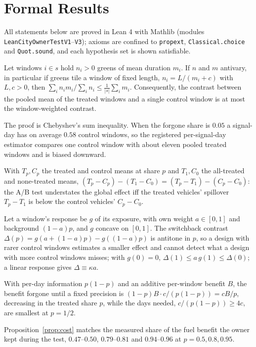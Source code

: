 \section{Formal Results}\label{sec:theory}
All statements below are proved in Lean 4 with Mathlib (modules \texttt{LeanCityOwnerTestV1}--\texttt{V3}); axioms are confined to
\texttt{propext}, \texttt{Classical.choice} and \texttt{Quot.sound}, and each hypothesis set is shown satisfiable.

\begin{proposition}\label{prop:pool}
Let windows $i\in s$ hold $n_i>0$ greens of mean duration $m_i$. If $n$ and $m$ antivary, in particular if greens tile a window of fixed
length, $n_i=L/(m_i+c)$ with $L,c>0$, then $\sum_i n_i m_i/\sum_i n_i \le \frac{1}{|s|}\sum_i m_i$. Consequently, the contrast between
the pooled mean of the treated windows and a single control window is at most the window-weighted contrast.
\end{proposition}
\noindent The proof is Chebyshev's sum inequality. When the forgone share is $0.05$ a signal-day has on average $0.58$ control windows, so
the registered per-signal-day estimator compares one control window with about eleven pooled treated windows and is biased downward.

\begin{proposition}[A/B accounting]\label{prop:ab}
With $T_p,C_p$ the treated and control means at share $p$ and $T_1,C_0$ the all-treated and none-treated means,
$(T_p-C_p)-(T_1-C_0)=(T_p-T_1)-(C_p-C_0)$: the A/B test understates the global effect iff the treated vehicles' spillover
$T_p-T_1$ is below the control vehicles' $C_p-C_0$.
\end{proposition}

\begin{proposition}\label{prop:design}
Let a window's response be $g$ of its exposure, with own weight $a\in[0,1]$ and background $(1-a)p$, and $g$ concave on $[0,1]$. The
switchback contrast $\Delta(p)=g(a+(1-a)p)-g((1-a)p)$ is antitone in $p$, so a design with rarer control windows estimates a smaller
effect and cannot detect what a design with more control windows misses; with $g(0)=0$, $\Delta(1)\le a\,g(1)\le\Delta(0)$; a linear
response gives $\Delta\equiv\kappa a$.
\end{proposition}

\begin{proposition}\label{prop:cost}
With per-day information $p(1-p)$ and an additive per-window benefit $B$, the benefit forgone until a fixed precision is
$(1-p)B\cdot c/(p(1-p))=cB/p$, decreasing in the treated share $p$, while the days needed, $c/(p(1-p))\ge 4c$, are smallest at $p=1/2$.
\end{proposition}
\noindent Proposition~\ref{prop:cost} matches the measured share of the fuel benefit the owner kept during the test, $0.47$--$0.50$,
$0.79$--$0.81$ and $0.94$--$0.96$ at $p=0.5,0.8,0.95$.

